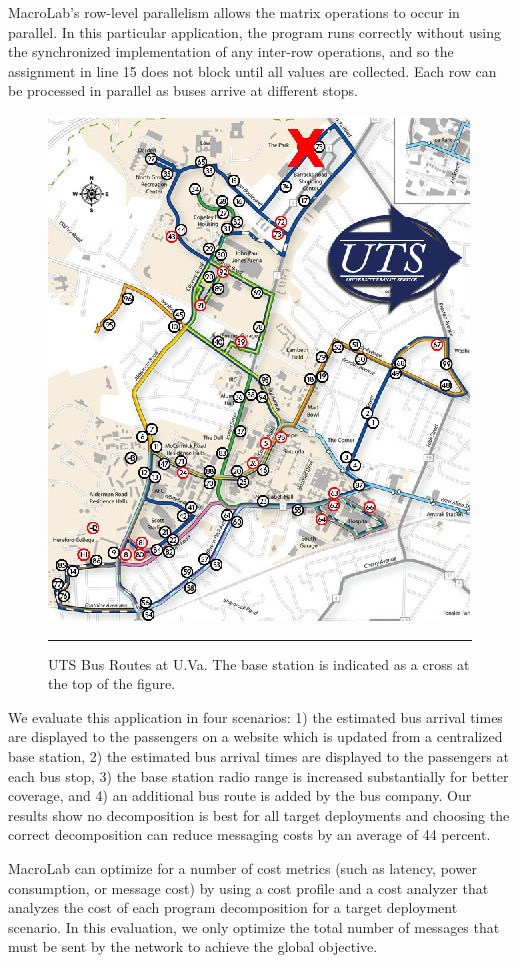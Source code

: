 MacroLab's row-level parallelism allows the matrix operations to occur
in parallel.  In this particular application, the program runs
correctly without using the synchronized implementation of any
inter-row operations, and so the assignment in line 15 does not block
until all values are collected.  Each row can be processed in parallel
as buses arrive at different stops.

\begin{figure}
  \centering
  \includegraphics[width=.65\columnwidth]{fig/UTSBusRoutes}
  \smallskip
  \hrule
  \caption[UTS Bus Routes at U.Va.]{UTS Bus Routes at U.Va. The base station is indicated as a cross at
    the top of the figure.}
  \label{fig:UTS}
\end{figure}

We evaluate this application in four scenarios: 1) the estimated bus arrival
times are displayed to the passengers on a website which is updated from a
centralized base station, 2) the estimated bus arrival times are displayed to
the passengers at each bus stop, 3) the base station radio range is increased
substantially for better coverage, and 4) an additional bus route is added by
the bus company.  Our results show no decomposition is best for all target
deployments and choosing the correct decomposition can reduce messaging
costs by an average of 44 percent.

MacroLab can optimize for a number of cost metrics (such as latency,
power consumption, or message cost) by using a cost profile and a
cost analyzer that analyzes the cost of each program decomposition for a
target deployment scenario. In this evaluation, we only optimize the
total number of messages that must be sent by the network to achieve the
global objective. 

